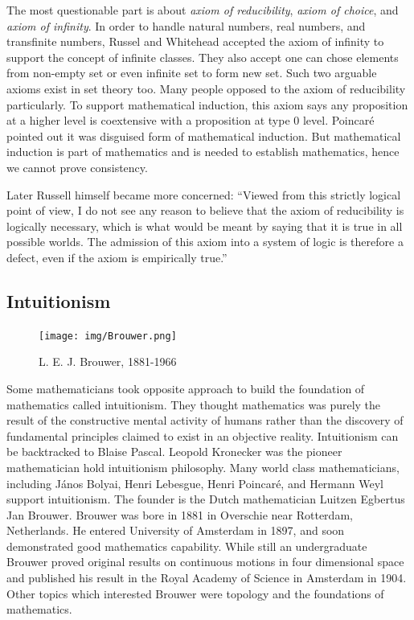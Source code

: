 \documentclass{article}
\begin{document}
The most questionable part is about {\em axiom of reducibility}, {\em axiom of choice}, and {\em axiom of infinity}. In order to handle natural numbers, real numbers, and transfinite numbers, Russel and Whitehead accepted the axiom of infinity to support the concept of infinite classes. They also accept one can chose elements from non-empty set or even infinite set to form new set. Such two arguable axioms exist in set theory too. Many people opposed to the axiom of reducibility particularly. To support mathematical induction, this axiom says any proposition at a higher level is coextensive with a proposition at type 0 level. Poincaré pointed out it was disguised form of mathematical induction. But mathematical induction is part of mathematics and is needed to establish mathematics, hence we cannot prove consistency.

Later Russell himself became more concerned: ``Viewed from this strictly logical point of view, I do not see any reason to believe that the axiom of reducibility is logically necessary, which is what would be meant by saying that it is true in all possible worlds. The admission of this axiom into a system of logic is therefore a defect, even if the axiom is empirically true.''\cite{M-Kline-2007}

\subsection{Intuitionism}

\begin{figure}
 \centering
 \texttt{[image: img/Brouwer.png]}
 \captionsetup{labelformat=empty}
 \caption{L. E. J. Brouwer, 1881-1966}
 \label{fig:Brouwer}
\end{figure}

Some mathematicians took opposite approach to build the foundation of mathematics called intuitionism. They thought mathematics was purely the result of the constructive mental activity of humans rather than the discovery of fundamental principles claimed to exist in an objective reality. Intuitionism can be backtracked to Blaise Pascal. Leopold Kronecker was the pioneer mathematician hold intuitionism philosophy. Many world class mathematicians, including János Bolyai, Henri Lebesgue, Henri Poincaré, and Hermann Weyl support intuitionism. The founder is the Dutch mathematician Luitzen Egbertus Jan Brouwer. Brouwer was bore in 1881 in Overschie near Rotterdam, Netherlands. He entered University of Amsterdam in 1897, and soon demonstrated good mathematics capability. While still an undergraduate Brouwer proved original results on continuous motions in four dimensional space and published his result in the Royal Academy of Science in Amsterdam in 1904. Other topics which interested Brouwer were topology and the foundations of mathematics.
\end{document}
